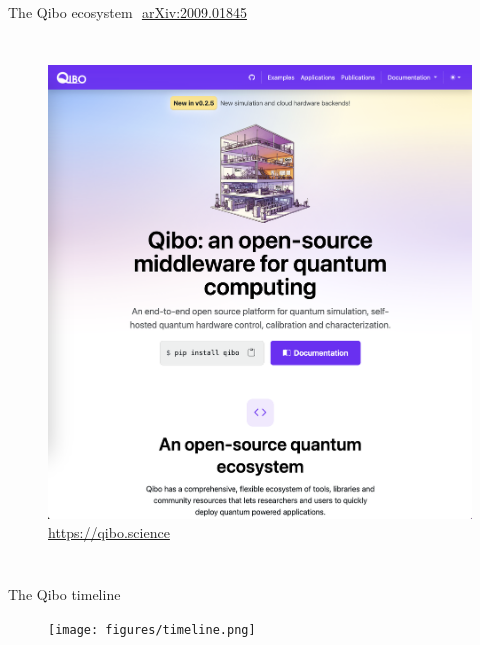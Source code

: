 \documentclass[aspectratio=169, 8pt, xcolor={svgnames}, hyperref={linkcolor=black}]{beamer}
\begin{document}
\begin{frame}{The Qibo ecosystem\hfill \faBook\,\, \href{https://arxiv.org/abs/2009.01845}{arXiv:2009.01845}}
\begin{columns}
     \column{4cm}
     \begin{figure}
       \includegraphics[width=\textwidth]{figures/docs.png}
       {\color{blue}\url{https://qibo.science}}
     \end{figure}
   \end{columns}
\end{frame}

\begin{frame}{The Qibo timeline}
\begin{figure}
   \texttt{[image: figures/timeline.png]}
\end{figure}  
\end{frame}
\end{document}
